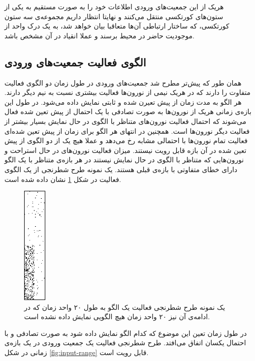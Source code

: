 \documentclass[12pt]{report}
\begin{document}
	هریک از این جمعیت‌های ورودی اطلاعات خود‌ را به صورت مستقیم به یکی از ستون‌های کورتکسی منتقل می‌کنند و نهایتا انتظار داریم مجموعه‌ی سه ستون کورتکسی، که ساختار ارتباطی آن‌ها متعاقبا بیان خواهد شد، به یک درک واحد از موجودیت حاضر در محیط برسند و عملا انقیاد در آن مشخص باشد.
	
	
	\subsection{الگوی فعالیت جمعیت‌های ورودی}
	
	همان طور که پیش‌تر مطرح شد جمعیت‌های ورودی در طول زمان دو الگوی فعالیت متفاوت را دارند که در هر‌یک نیمی از نورون‌ها فعالیت بیشتری نسبت به نیم دیگر دارند. هر الگو به مدت زمان از پیش تعیرن شده و ثابتی نمایش داده می‌شود. در طول این بازه‌ی زمانی هریک از نورون‌ها به صورت تصادفی با یک احتمال از پیش تعین شده فعال می‌شوند که احتمال فعالیت نورون‌های متناظر با الگوی در حال نمایش بسیار بیشتر از فعالیت دیگر نورون‌ها است. همچنین در انتهای هر الگو برای زمان از پیش تعین شده‌ای فعالیت تمام نورون‌ها با احتمالی مشابه رخ می‌دهد  و عملا هیچ یک از دو الگوی از پیش تعین شده در آن بازه قابل رویت نیستند. میزان فعالیت نورون‌های در حال استراحت و نورون‌هایی که متناظر با الگوی در حال نمایش نیستند در هر بازه‌ی متناظر با یک الگو دارای خطای متفاوتی با بازه‌ی قبلی هستند. یک نمونه طرح شطرنجی از یک الگوی فعالیت در شکل \ref{fig:input-single} نشان داده شده است.
	
\begin{figure}[H]
	\centering
	\includegraphics[width=0.1\linewidth]{input-single.png}
	\caption[NS]{
		یک نمونه طرح شطرنجی فعالیت یک الگو به طول ۲۰ واحد زمان که در ادامه‌ی آن نیز ۲۰ واحد زمان هیچ الگویی نمایش داده نشده است.
	}
	\label{fig:input-single} 
\end{figure}
	
	در طول زمان تعین این موضوع که کدام الگو نمایش داده شود به صورت تصادفی و با احتمال یکسان اتفاق می‌افتد. طرح شطرنجی فعالیت یک جمعیت ورودی در یک بازه‌ی زمانی در شکل \ref{fig:input-range} قابل رویت است.
	
\end{document}
